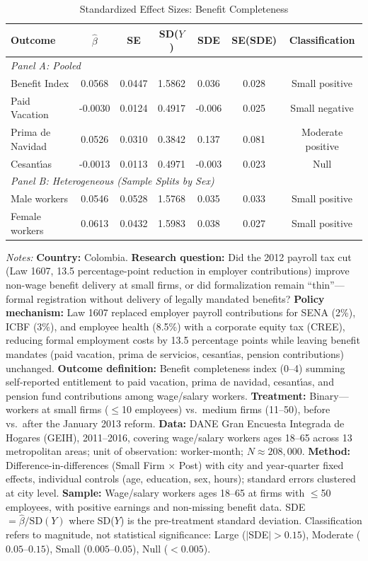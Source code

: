 \begin{table}[htbp]
\centering
\caption{Standardized Effect Sizes: Benefit Completeness}
\label{tab:sde}
\small
\begin{tabular}{lcccccc}
\toprule
Outcome & $\hat{\beta}$ & SE & SD($Y$) & SDE & SE(SDE) & Classification \\
\midrule
\multicolumn{7}{l}{\textit{Panel A: Pooled}} \\[3pt]
Benefit Index & 0.0568 & 0.0447 & 1.5862 & 0.036 & 0.028 & Small positive \\
Paid Vacation & -0.0030 & 0.0124 & 0.4917 & -0.006 & 0.025 & Small negative \\
Prima de Navidad & 0.0526 & 0.0310 & 0.3842 & 0.137 & 0.081 & Moderate positive \\
Cesant\'{\i}as & -0.0013 & 0.0113 & 0.4971 & -0.003 & 0.023 & Null \\
\midrule
\multicolumn{7}{l}{\textit{Panel B: Heterogeneous (Sample Splits by Sex)}} \\[3pt]
Male workers & 0.0546 & 0.0528 & 1.5768 & 0.035 & 0.033 & Small positive \\
Female workers & 0.0613 & 0.0432 & 1.5983 & 0.038 & 0.027 & Small positive \\
\bottomrule
\end{tabular}
\begin{tablenotes}
\item \textit{Notes:} \textbf{Country:} Colombia. \textbf{Research question:} Did the 2012 payroll tax cut (Law 1607, 13.5 percentage-point reduction in employer contributions) improve non-wage benefit delivery at small firms, or did formalization remain ``thin''---formal registration without delivery of legally mandated benefits? \textbf{Policy mechanism:} Law 1607 replaced employer payroll contributions for SENA (2\%), ICBF (3\%), and employee health (8.5\%) with a corporate equity tax (CREE), reducing formal employment costs by 13.5 percentage points while leaving benefit mandates (paid vacation, prima de servicios, cesant\'{\i}as, pension contributions) unchanged. \textbf{Outcome definition:} Benefit completeness index (0--4) summing self-reported entitlement to paid vacation, prima de navidad, cesant\'{\i}as, and pension fund contributions among wage/salary workers. \textbf{Treatment:} Binary---workers at small firms ($\leq$10 employees) vs.\ medium firms (11--50), before vs.\ after the January 2013 reform. \textbf{Data:} DANE Gran Encuesta Integrada de Hogares (GEIH), 2011--2016, covering wage/salary workers ages 18--65 across 13 metropolitan areas; unit of observation: worker-month; $N \approx 208{,}000$. \textbf{Method:} Difference-in-differences (Small Firm $\times$ Post) with city and year-quarter fixed effects, individual controls (age, education, sex, hours); standard errors clustered at city level. \textbf{Sample:} Wage/salary workers ages 18--65 at firms with $\leq$50 employees, with positive earnings and non-missing benefit data. SDE $= \hat{\beta} / \text{SD}(Y)$ where SD($Y$) is the pre-treatment standard deviation. Classification refers to magnitude, not statistical significance: Large ($|$SDE$| > 0.15$), Moderate ($0.05$--$0.15$), Small ($0.005$--$0.05$), Null ($< 0.005$).
\end{tablenotes}
\end{table}
